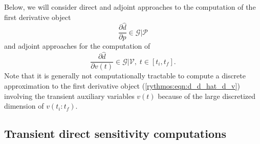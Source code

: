 \documentclass[pdf,ps2pdf,11pt]{SANDreport}
\begin{document}
Below, we will consider direct and adjoint approaches to the computation of
the first derivative object
%
\begin{equation}
\frac{\partial \hat{d}}{\partial p} \in \mathcal{G}|\mathcal{P}
\label{rythmos:eqn:d_d_hat_d_p}
\end{equation}
%
and adjoint approaches for the computation of
%
\begin{equation}
\frac{\partial \hat{d}}{\partial v(t)} \in \mathcal{G}|\mathcal{V}, \; t \in [t_i,t_f].
\label{rythmos:eqn:d_d_hat_d_v}
\end{equation}
%
Note that it is generally not computationally tractable to compute a discrete
approximation to the first derivative object (\ref{rythmos:eqn:d_d_hat_d_v})
involving the transient auxiliary variables $v(t)$ because of the large
discretized dimension of $v(t_i:t_f)$.

\subsection{Transient direct sensitivity computations}
\label{rythmos:sec:direct-sens}
\end{document}
